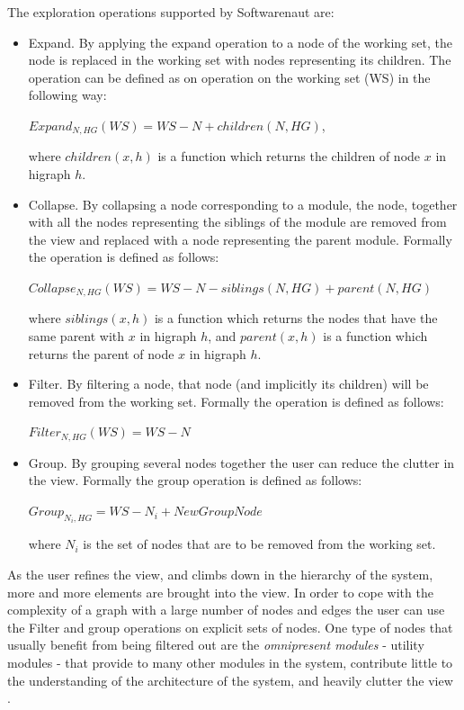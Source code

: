 \documentclass[preprint,12pt]{elsarticle}
\begin{document}
The exploration operations supported by Softwarenaut are:

\begin{itemize}

\item Expand. By applying the expand operation to a node of the working set, the node is replaced in the working set with nodes representing its children. The operation can be defined as on operation on the working set (WS) in the following way:

\hspace{0.5cm} $ Expand_{N,HG} (WS) = WS - N + children (N, HG)$, 

where $children(x,h)$ is a function which returns the children of node $x$ in higraph $h$.

\item Collapse. By collapsing a node corresponding to a module, the node, together with all the nodes representing the siblings of the module are removed from the view and replaced with a node representing the parent module. Formally the operation is defined as follows:

\hspace{0.5cm} $ Collapse_{N,HG} (WS) = WS - N - siblings (N, HG) + parent (N, HG)$

where $siblings(x,h)$ is a function which returns the nodes that have the same parent with $x$ in higraph $h$, and $parent(x,h)$ is a function which returns the parent of node $x$ in higraph $h$. 

\item Filter.
By filtering a node, that node (and implicitly its children) will be removed from the working set. Formally the operation is defined as follows:

$ Filter_{N,HG} (WS) = WS - N$

\item Group.
By grouping several nodes together the user can reduce the clutter in the view. Formally the group operation is defined as follows: 

$ Group_{N_{i},HG} = WS - N_i + NewGroupNode $

where $N_i$ is the set of nodes that are to be removed from the working set.


\end{itemize}

As the user refines the view, and climbs down in the hierarchy of the system, more and more elements are brought into the view. In order to cope with the complexity of a graph with a large number of nodes and edges the user can use the Filter and group operations on explicit sets of nodes. One type of nodes that usually benefit from being filtered out are the  {\em omnipresent modules} - utility modules - that provide to many other modules in the system, contribute little to the understanding of the architecture of the system, and heavily clutter the view \cite{mitchell-bunch}.
\end{document}
